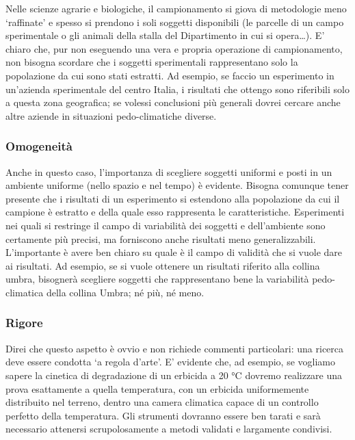 \documentclass[a4paper,12pt,oneside]{book}
\theoremstyle{definition}
\theoremstyle{definition}
\theoremstyle{definition}
\theoremstyle{remark}
\begin{document}
Nelle scienze agrarie e biologiche, il campionamento si giova di
metodologie meno `raffinate' e spesso si prendono i soli soggetti
disponibili (le parcelle di un campo sperimentale o gli animali della
stalla del Dipartimento in cui si opera\ldots{}). E' chiaro che, pur non
eseguendo una vera e propria operazione di campionamento, non bisogna
scordare che i soggetti sperimentali rappresentano solo la popolazione
da cui sono stati estratti. Ad esempio, se faccio un esperimento in
un'azienda sperimentale del centro Italia, i risultati che ottengo sono
riferibili solo a questa zona geografica; se volessi conclusioni più
generali dovrei cercare anche altre aziende in situazioni
pedo-climatiche diverse.

\subsubsection{Omogeneità}\label{omogeneita}

Anche in questo caso, l'importanza di scegliere soggetti uniformi e
posti in un ambiente uniforme (nello spazio e nel tempo) è evidente.
Bisogna comunque tener presente che i risultati di un esperimento si
estendono alla popolazione da cui il campione è estratto e della quale
esso rappresenta le caratteristiche. Esperimenti nei quali si restringe
il campo di variabilità dei soggetti e dell'ambiente sono certamente più
precisi, ma forniscono anche risultati meno generalizzabili.
L'importante è avere ben chiaro su quale è il campo di validità che si
vuole dare ai risultati. Ad esempio, se si vuole ottenere un risultati
riferito alla collina umbra, bisognerà scegliere soggetti che
rappresentano bene la variabilità pedo-climatica della collina Umbra; né
più, né meno.

\subsubsection{Rigore}\label{rigore}

Direi che questo aspetto è ovvio e non richiede commenti particolari:
una ricerca deve essere condotta `a regola d'arte'. E' evidente che, ad
esempio, se vogliamo sapere la cinetica di degradazione di un erbicida a
20 °C dovremo realizzare una prova esattamente a quella temperatura, con
un erbicida uniformemente distribuito nel terreno, dentro una camera
climatica capace di un controllo perfetto della temperatura. Gli
strumenti dovranno essere ben tarati e sarà necessario attenersi
scrupolosamente a metodi validati e largamente condivisi.
\end{document}
